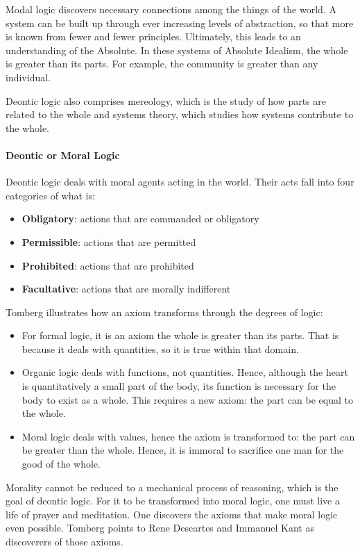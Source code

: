 Modal logic discovers necessary connections among the things of the world. A system can be built up through ever increasing levels of abstraction, so that more is known from fewer and fewer principles. Ultimately, this leads to an understanding of the Absolute. In these systems of Absolute Idealism, the whole is greater than its parts. For example, the community is greater than any individual.

Deontic logic also comprises mereology, which is the study of how parts are related to the whole and systems theory, which studies how systems contribute to the whole.

\paragraph{Deontic or Moral Logic}
Deontic logic deals with moral agents acting in the world. Their acts fall into four categories of what is:

\begin{itemize}
\item \textbf{Obligatory}: actions that are commanded or obligatory 
\item \textbf{Permissible}: actions that are permitted 
\item \textbf{Prohibited}: actions that are prohibited 
\item \textbf{Facultative}: actions that are morally indifferent 
\end{itemize}
Tomberg illustrates how an axiom transforms through the degrees of logic:

\begin{itemize}
\item For formal logic, it is an axiom the whole is greater than its parts. That is because it deals with quantities, so it is true within that domain. 
\item Organic logic deals with functions, not quantities. Hence, although the heart is quantitatively a small part of the body, its function is necessary for the body to exist as a whole. This requires a new axiom: the part can be equal to the whole. 
\item Moral logic deals with values, hence the axiom is transformed to: the part can be greater than the whole. Hence, it is immoral to sacrifice one man for the good of the whole. 
\end{itemize}
Morality cannot be reduced to a mechanical process of reasoning, which is the goal of deontic logic. For it to be transformed into moral logic, one must live a life of prayer and meditation. One discovers the axioms that make moral logic even possible. Tomberg points to Rene Descartes and Immanuel Kant as discoverers of those axioms.


